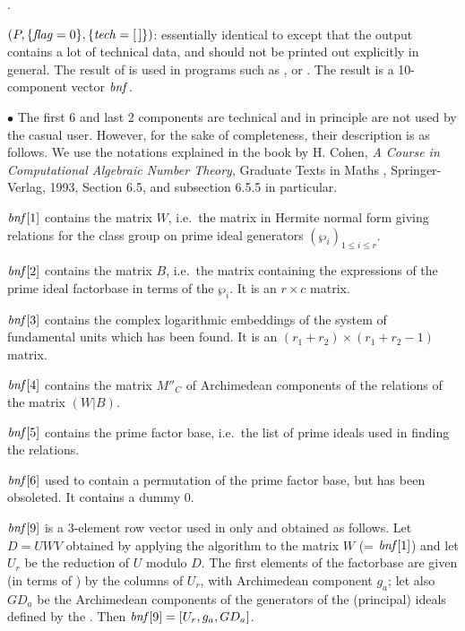 .

$(P,\{\hbox{\it f\kern0pt lag\/}=0\},\{\hbox{\it tech\/}=[\,]\})$: essentially identical
to  except that the output contains a lot of technical data,
and should not be printed out explicitly in general. The result of
 is used in programs such as ,
 or . The result is a 10-component vector
$\hbox{\it bnf\/}$.

\noindent $\bullet$ The first 6 and last 2 components are technical and in
principle are not used by the casual user. However, for the sake of
completeness, their description is as follows. We use the notations explained
in the book by H. Cohen, \emph{A Course in Computational Algebraic Number
Theory}, Graduate Texts in Maths , Springer-Verlag, 1993, Section
6.5, and subsection 6.5.5 in particular.

$\hbox{\it bnf\/}[1]$ contains the matrix $W$, i.e.~the matrix in Hermite normal
form giving relations for the class group on prime ideal generators
$(\wp_i)_{1\le i\le r}$.

$\hbox{\it bnf\/}[2]$ contains the matrix $B$, i.e.~the matrix containing the
expressions of the prime ideal factorbase in terms of the $\wp_i$. It is an
$r\times c$ matrix.

$\hbox{\it bnf\/}[3]$ contains the complex logarithmic embeddings of the system of
fundamental units which has been found. It is an $(r_1+r_2)\times(r_1+r_2-1)$
matrix.

$\hbox{\it bnf\/}[4]$ contains the matrix $M''_C$ of Archimedean components of the
relations of the matrix $(W|B)$.

$\hbox{\it bnf\/}[5]$ contains the prime factor base, i.e.~the list of prime
ideals used in finding the relations.

$\hbox{\it bnf\/}[6]$ used to contain a permutation of the prime factor base, but
has been obsoleted. It contains a dummy $0$.

$\hbox{\it bnf\/}[9]$ is a 3-element row vector used in  only
and obtained as follows.  Let $D = U W V$ obtained by applying the
 algorithm to the matrix $W$ (= $\hbox{\it bnf\/}[1]$) and
let $U_r$ be the reduction of $U$ modulo $D$. The first elements of the
factorbase are given (in terms of ) by the columns of $U_r$,
with Archimedean component $g_a$; let also $GD_a$ be the Archimedean
components of the generators of the (principal) ideals defined by the
. Then $\hbox{\it bnf\/}[9]=[U_r, g_a, GD_a]$.

